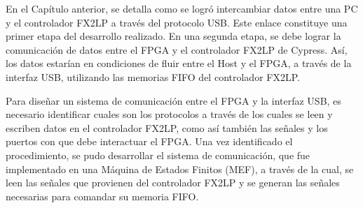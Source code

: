 En el Capítulo anterior, se detalla como se logró intercambiar datos entre una PC y el controlador FX2LP a través del protocolo USB. Este enlace constituye una primer etapa del desarrollo realizado. En una segunda etapa, se debe lograr la comunicación de datos entre el FPGA y el controlador FX2LP de Cypress. Así, los datos estarían en condiciones de fluir entre el Host y el FPGA, a través de la interfaz USB, utilizando las memorias FIFO del controlador FX2LP. 

Para diseñar un sistema de comunicación entre el FPGA y la interfaz USB, es necesario identificar cuales son los protocolos a través de los cuales se leen y escriben datos en el controlador FX2LP, como así también las señales y los puertos con que debe interactuar el FPGA. Una vez identificado el procedimiento, se pudo desarrollar el sistema de comunicación, que fue implementado en una Máquina de Estados Finitos (MEF), a través de la cual, se leen las señales que provienen del controlador FX2LP y se generan las señales necesarias para comandar su memoria FIFO.


%	
%	

